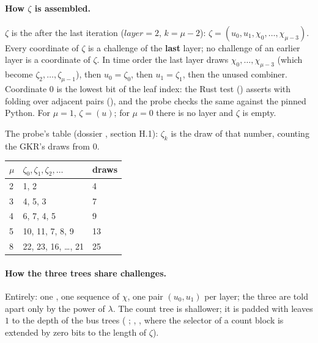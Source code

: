 \begin{sloppypar}
\paragraph{How $ζ$ is assembled.} $ζ$ is the  after the last iteration
($\mathit{layer} = 2$, $k = μ − 2$): $ζ = (u_0, u_1, χ_0, …, χ_{μ−3})$. Every coordinate of $ζ$ is
a challenge of the \textbf{last} layer; no challenge of an earlier layer is a coordinate of $ζ$.
In time order the last layer draws $χ_0, …, χ_{μ−3}$ (which become $ζ_2, …, ζ_{μ−1}$), then
$u_0 = ζ_0$, then $u_1 = ζ_1$, then the unused combiner. Coordinate 0 is the lowest bit of the
leaf index: the Rust test 
() asserts
 with 
folding  over adjacent pairs (), and the probe checks the
same against the pinned Python. For $μ = 1$, $ζ = (u)$; for $μ = 0$ there is no layer and $ζ$ is
empty.
\end{sloppypar}

The probe's table (dossier , section H.1): $ζ_k$ is the draw of that number,
counting the GKR's draws from 0.

\begin{center}\small
\begin{tabular}{@{}lll@{}}
\toprule
$μ$ & $ζ_0, ζ_1, ζ_2, …$ & draws \\
\midrule
2 & 1, 2 & 4 \\
3 & 4, 5, 3 & 7 \\
4 & 6, 7, 4, 5 & 9 \\
5 & 10, 11, 7, 8, 9 & 13 \\
8 & 22, 23, 16, …, 21 & 25 \\
\bottomrule
\end{tabular}
\end{center}

\paragraph{How the three trees share challenges.} Entirely: one , one sequence of
$χ$, one pair $(u_0, u_1)$ per layer; the three are told apart only by the power of $λ$. The
count tree is shallower; it is padded with leaves $1$ to the depth of the bus trees
( ; , ,
where the selector of a count block is extended by zero bits to the length of $ζ$).

